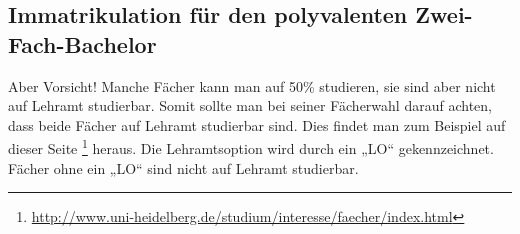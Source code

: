 %
%
%
%
%
%

\subsection{Immatrikulation für den polyvalenten Zwei-Fach-Bachelor}
Aber Vorsicht! Manche Fächer kann man auf 50\% studieren, sie sind aber nicht auf Lehramt studierbar. Somit sollte man bei seiner Fächerwahl darauf achten, dass beide Fächer auf Lehramt studierbar sind. Dies findet man zum Beispiel auf dieser Seite \footnote{\url{http://www.uni-heidelberg.de/studium/interesse/faecher/index.html}} heraus. Die Lehramtsoption wird durch ein „LO“ gekennzeichnet. Fächer ohne ein „LO“ sind nicht auf Lehramt studierbar.

